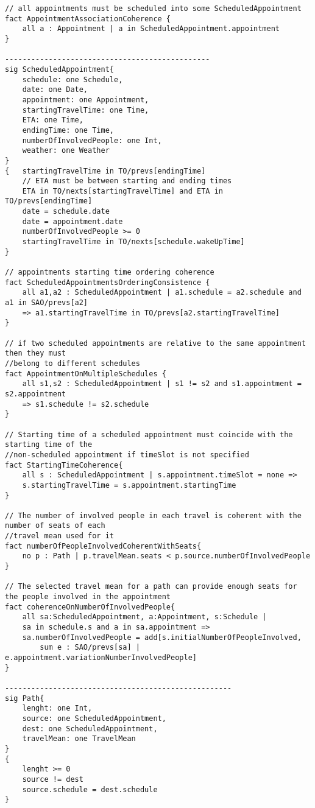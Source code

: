 \begin{lstlisting}
// all appointments must be scheduled into some ScheduledAppointment
fact AppointmentAssociationCoherence {
	all a : Appointment | a in ScheduledAppointment.appointment
}

-----------------------------------------------
sig ScheduledAppointment{
	schedule: one Schedule,
	date: one Date,
	appointment: one Appointment,
	startingTravelTime: one Time,
	ETA: one Time,
	endingTime: one Time,
	numberOfInvolvedPeople: one Int,
	weather: one Weather
}
{	startingTravelTime in TO/prevs[endingTime]
	// ETA must be between starting and ending times
	ETA in TO/nexts[startingTravelTime] and ETA in TO/prevs[endingTime] 
	date = schedule.date																				
	date = appointment.date																			
	numberOfInvolvedPeople >= 0
	startingTravelTime in TO/nexts[schedule.wakeUpTime]
}

// appointments starting time ordering coherence
fact ScheduledAppointmentsOrderingConsistence {
	all a1,a2 : ScheduledAppointment | a1.schedule = a2.schedule and a1 in SAO/prevs[a2] 
	=> a1.startingTravelTime in TO/prevs[a2.startingTravelTime]
}

// if two scheduled appointments are relative to the same appointment then they must 
//belong to different schedules
fact AppointmentOnMultipleSchedules {
	all s1,s2 : ScheduledAppointment | s1 != s2 and s1.appointment = s2.appointment 
	=> s1.schedule != s2.schedule
}

// Starting time of a scheduled appointment must coincide with the starting time of the 
//non-scheduled appointment if timeSlot is not specified
fact StartingTimeCoherence{
	all s : ScheduledAppointment | s.appointment.timeSlot = none =>
	s.startingTravelTime = s.appointment.startingTime
}

// The number of involved people in each travel is coherent with the number of seats of each 
//travel mean used for it
fact numberOfPeopleInvolvedCoherentWithSeats{
	no p : Path | p.travelMean.seats < p.source.numberOfInvolvedPeople
}

// The selected travel mean for a path can provide enough seats for the people involved in the appointment
fact coherenceOnNumberOfInvolvedPeople{
	all sa:ScheduledAppointment, a:Appointment, s:Schedule | 
	sa in schedule.s and a in sa.appointment =>
	sa.numberOfInvolvedPeople = add[s.initialNumberOfPeopleInvolved,
		sum e : SAO/prevs[sa] | e.appointment.variationNumberInvolvedPeople]
}

----------------------------------------------------
sig Path{
	lenght: one Int,
	source: one ScheduledAppointment,
	dest: one ScheduledAppointment,
	travelMean: one TravelMean
}
{
	lenght >= 0
	source != dest
	source.schedule = dest.schedule
}


\end{lstlisting}
